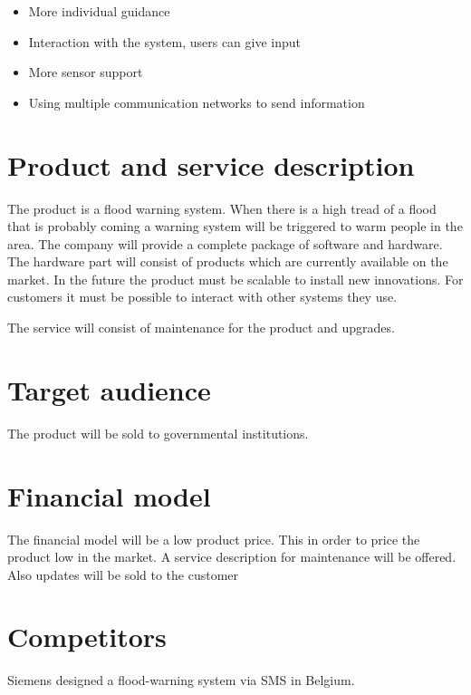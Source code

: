 	\begin{itemize}
		\item More individual guidance
		\item Interaction with the system, users can give input
		\item More sensor support
		\item Using multiple communication networks to send information
	\end{itemize}

\section{Product and service description}
The product is a flood warning system. When there is a high tread of a flood that is probably coming a warning system will be triggered to warm people in the area. The company will provide a complete package of software and hardware. The hardware part will consist of products which are currently available on the market. In the future the product must be scalable to install new innovations. For customers it must be possible to interact with other systems they use.

The service will consist of maintenance for the product and upgrades.

\section{Target audience}
The product will be sold to governmental institutions. 

\section{Financial model}
The financial model will be a low product price. This in order to price the product low in the market. A service description for maintenance will be offered. Also updates will be sold to the customer

\section{Competitors}
Siemens designed a flood-warning system via SMS in Belgium.




